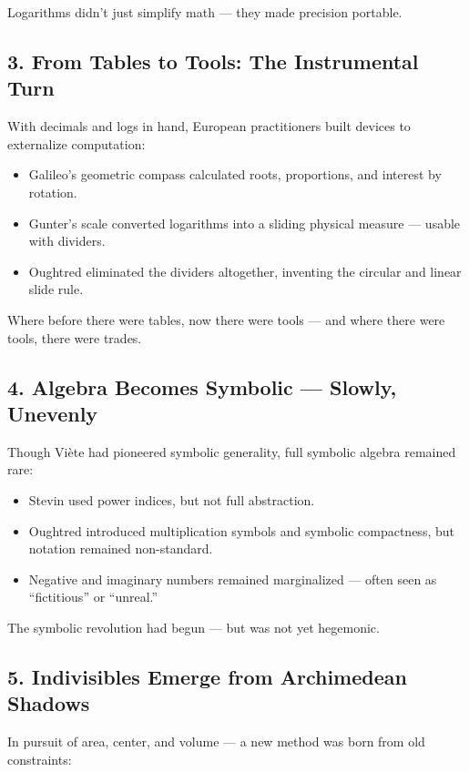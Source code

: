 \documentclass[9pt]{article}
\begin{document}
Logarithms didn't just simplify math — they made precision portable.

\subsection*{3. From Tables to Tools: The Instrumental Turn}

With decimals and logs in hand, European practitioners built devices to externalize computation:

\begin{itemize}
    \item Galileo's geometric compass calculated roots, proportions, and interest by rotation.
    \item Gunter’s scale converted logarithms into a sliding physical measure — usable with dividers.
    \item Oughtred eliminated the dividers altogether, inventing the circular and linear slide rule.
\end{itemize}

Where before there were tables, now there were tools — and where there were tools, there were trades.

\subsection*{4. Algebra Becomes Symbolic — Slowly, Unevenly}

Though Viète had pioneered symbolic generality, full symbolic algebra remained rare:

\begin{itemize}
    \item Stevin used power indices, but not full abstraction.
    \item Oughtred introduced multiplication symbols and symbolic compactness, but notation remained non-standard.
    \item Negative and imaginary numbers remained marginalized — often seen as “fictitious” or “unreal.”
\end{itemize}

The symbolic revolution had begun — but was not yet hegemonic.

\subsection*{5. Indivisibles Emerge from Archimedean Shadows}

In pursuit of area, center, and volume — a new method was born from old constraints:
\end{document}
